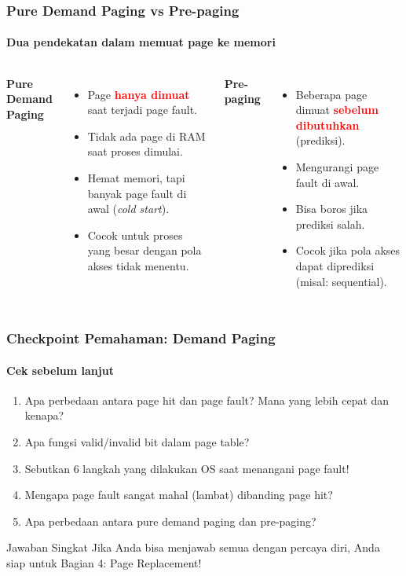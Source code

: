 \documentclass[t,aspectratio=169,xcolor=dvipsnames]{beamer}
\newcommand{\tem}[1]{\textbf{\textcolor{red}{#1}}}
\begin{document}
\begin{frame}
    \frametitle{Pure Demand Paging vs Pre-paging}
    \framesubtitle{Dua pendekatan dalam memuat page ke memori}
    \small

    \begin{columns}[T]
        \textbf{Pure Demand Paging}
        \begin{itemize}
            \item Page \tem{hanya dimuat} saat terjadi page fault.
            \item Tidak ada page di RAM saat proses dimulai.
            \item Hemat memori, tapi banyak page fault di awal (\textit{cold start}).
            \item Cocok untuk proses yang besar dengan pola akses tidak menentu.
        \end{itemize}

        \textbf{Pre-paging}
        \begin{itemize}
            \item Beberapa page dimuat \tem{sebelum dibutuhkan} (prediksi).
            \item Mengurangi page fault di awal.
            \item Bisa boros jika prediksi salah.
            \item Cocok jika pola akses dapat diprediksi (misal: sequential).
        \end{itemize}
    \end{columns}
\end{frame}

\begin{frame}
    \frametitle{Checkpoint Pemahaman: Demand Paging}
    \framesubtitle{Cek sebelum lanjut}
    \small

    \begin{enumerate}
        \item Apa perbedaan antara page hit dan page fault? Mana yang lebih cepat dan kenapa?
        \vspace{0.1cm}
        \item Apa fungsi valid/invalid bit dalam page table?
        \vspace{0.1cm}
        \item Sebutkan 6 langkah yang dilakukan OS saat menangani page fault!
        \vspace{0.1cm}
        \item Mengapa page fault sangat mahal (lambat) dibanding page hit?
        \vspace{0.1cm}
        \item Apa perbedaan antara pure demand paging dan pre-paging?
    \end{enumerate}

    \vspace{0.2cm}
    \begin{block}{Jawaban Singkat}
        Jika Anda bisa menjawab semua dengan percaya diri, Anda siap untuk Bagian 4: Page Replacement!
    \end{block}
\end{frame}
\end{document}

